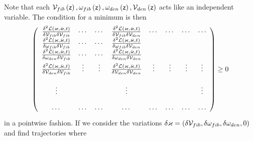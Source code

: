 Note that each ${\cal V}_{fib}\left( {\sf z}\right) ,\omega _{fib}\left( 
{\sf z}\right) ,\omega _{den}\left( {\sf z}\right) ,{\cal V}_{den}\left( 
{\sf z}\right) $ acts like an independent variable. The condition for a
minimum is then 
\begin{equation}
\left( 
\begin{array}{cccccccc}
\frac{\delta ^{2}{\cal L}\left( \varkappa ,\dot{\varkappa},t\right) }{\delta 
{\cal V}_{fib}\delta {\cal V}_{fib}} & \cdots & \cdots & \frac{\delta ^{2}%
{\cal L}\left( \varkappa ,\dot{\varkappa},t\right) }{\delta {\cal V}%
_{fib}\delta {\cal V}_{den}} & \cdots & \cdots & \cdots & \cdots \\ 
\frac{\delta ^{2}{\cal L}\left( \varkappa ,\dot{\varkappa},t\right) }{\delta 
{\cal \omega }_{fib}\delta {\cal V}_{fib}} & \cdots & \cdots & \frac{\delta
^{2}{\cal L}\left( \varkappa ,\dot{\varkappa},t\right) }{\delta {\cal \omega 
}_{fib}\delta {\cal V}_{den}} &  &  &  &  \\ 
\frac{\delta ^{2}{\cal L}\left( \varkappa ,\dot{\varkappa},t\right) }{\delta 
{\cal \omega }_{den}\delta {\cal V}_{fib}} & \cdots & \cdots & \frac{\delta
^{2}{\cal L}\left( \varkappa ,\dot{\varkappa},t\right) }{\delta {\cal \omega 
}_{den}\delta {\cal V}_{den}} &  &  &  &  \\ 
\frac{\delta ^{2}{\cal L}\left( \varkappa ,\dot{\varkappa},t\right) }{\delta 
{\cal V}_{den}\delta {\cal V}_{fib}} & \vdots & \vdots & \frac{\delta ^{2}%
{\cal L}\left( \varkappa ,\dot{\varkappa},t\right) }{\delta {\cal V}%
_{den}\delta {\cal V}_{den}} & \vdots & \vdots & \vdots & \vdots \\ 
&  &  &  &  &  &  &  \\ 
\vdots &  &  & \vdots &  &  &  & \vdots \\ 
&  &  &  &  &  &  &  \\ 
\cdots & \cdots & \cdots & \cdots & \cdots & \cdots & \cdots & \cdots%
\end{array}%
\right) \geq 0
\end{equation}%
in a pointwise fashion. If we consider the variations $\delta \varkappa
=\left( \delta {\cal V}_{fib},\delta {\cal \omega }_{fib},\delta {\cal %
\omega }_{den},0\right) $ and find trajectories where 
